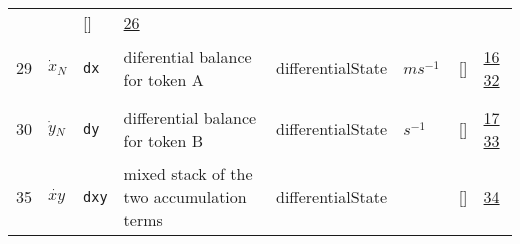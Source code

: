 \begin{longtable}{|p{1cm}|p{3cm}|p{3cm}|p{7cm}|p{3.0cm}|p{3cm}|p{2cm}|p{1cm}|}
             & $  $
             & []
             & \hyperlink{"e:26"}{ 26 }
                 \\
    29
             & \hypertarget{"v:29"}{ $ {{\dot{x}}}{_{N}} $}
             & \verb|dx|
             & diferential balance for token A
             & \begin{lay}differentialState \end{lay}
             & $ m s^{-1} \, $
             & []
             & \hyperlink{"e:16"}{ 16 }
                 \hyperlink{"e:32"}{ 32 }
                 \\
    30
             & \hypertarget{"v:30"}{ $ {{\dot{y}}}{_{N}} $}
             & \verb|dy|
             & differential balance for token B
             & \begin{lay}differentialState \end{lay}
             & $ s^{-1} \, $
             & []
             & \hyperlink{"e:17"}{ 17 }
                 \hyperlink{"e:33"}{ 33 }
                 \\
    35
             & \hypertarget{"v:35"}{ $ {{\dot{xy}}}{_{}} $}
             & \verb|dxy|
             & mixed stack of the two accumulation terms
             & \begin{lay}differentialState \end{lay}
             & $  $
             & []
             & \hyperlink{"e:34"}{ 34 }
                 \\
    \end{longtable}